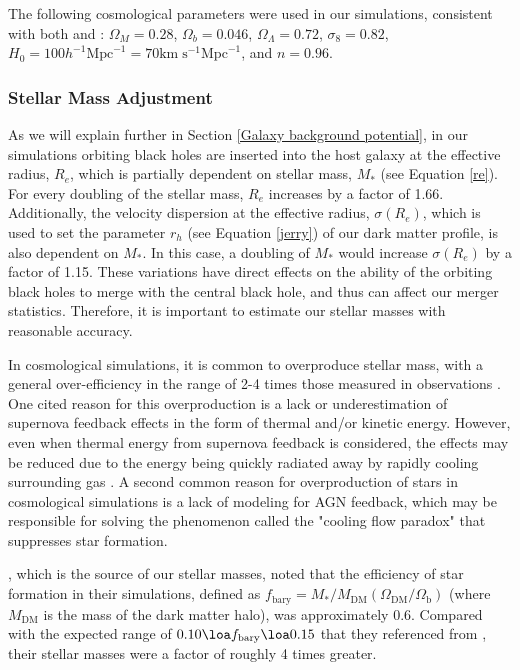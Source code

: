 \documentclass[fleqn,usenatbib,useAMS]{mnras}
\begin{document}
The following cosmological parameters were used in our simulations, consistent with both \citet{2012MNRAS.425..641L} and \citet{2015ApJ...799..178K}:   $\Omega_M = 0.28$, $\Omega_b = 0.046$, $\Omega_\Lambda = 0.72$, $\sigma_8 = 0.82$, $H_0 = 100h^{-1}\mathrm{Mpc}^{-1} = 70 \mathrm{km}\;\mathrm{s}^{-1} \mathrm{Mpc}^{-1}$, and $n = 0.96$.

\subsubsection{Stellar Mass Adjustment}
As we will explain further in Section \ref{Galaxy background potential}, in our simulations orbiting black holes are inserted into the host galaxy at the effective radius, $R_e$, which is partially dependent on stellar mass, $M_*$ (see Equation \ref{re}).  For every doubling of the stellar mass, $R_e$ increases by a factor of 1.66.  Additionally, the velocity dispersion at the effective radius, $\sigma(R_e)$, which is used to set the parameter $r_h$ (see Equation \ref{jerry}) of our dark matter profile, is also dependent on $M_*$.  In this case, a doubling of $M_*$ would increase $\sigma(R_e)$ by a factor of 1.15.  These variations have direct effects on the ability of the orbiting black holes to merge with the central black hole, and thus can affect our merger statistics.  Therefore, it is important to estimate our stellar masses with reasonable accuracy.

In cosmological simulations, it is common to overproduce stellar mass, with a general over-efficiency in the range of 2-4 times those measured in observations \citep{1996ApJS..105...19K, 2010MNRAS.404.1111G, 2010ApJ...725.2312O}.  One cited reason for this overproduction is a lack or underestimation of supernova feedback effects in the form of thermal and/or kinetic energy.  However, even when thermal energy from supernova feedback is considered, the effects may be reduced due to the energy being quickly radiated away by rapidly cooling surrounding gas \citep{1996ApJS..105...19K}.  A second common reason for overproduction of stars in cosmological simulations is a lack of modeling for AGN feedback, which may be responsible for solving the phenomenon called the "cooling flow paradox" \citep{2001MNRAS.321L..20F} that suppresses star formation. 

\citet{2012MNRAS.425..641L}, which is the source of our stellar masses, noted that the efficiency of star formation in their simulations, defined as $f_\mathrm{bary}=M_*/M_{\mathrm{DM}}(\Omega_\mathrm{DM}/\Omega_\mathrm{b})$ (where $M_\mathrm{DM}$ is the mass of the dark matter halo), was approximately 0.6.  Compared with the expected range of $0.10 \loa f_\mathrm{bary} \loa 0.15$ that they referenced from \citet{2012ApJ...746...95L}, their stellar masses were a factor of roughly 4 times greater.
\end{document}
